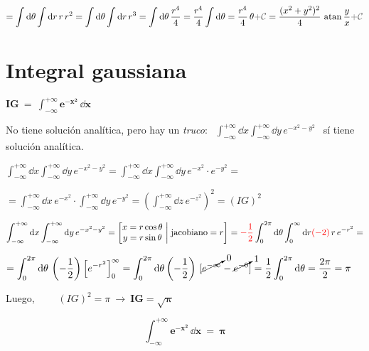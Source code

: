 $\displaystyle = \int \dd \theta \int \dd r \, r\, r^2 =\int \dd \theta \int \dd r \, r^3 = \int \dd \theta \, \dfrac {r^4} 4 = \dfrac {r^4} 4  \int \dd \theta = \dfrac {r^4} 4  \, \theta \textcolor{gris}{+ \mathcal C}=\dfrac{(x^2+y^2)^2}4 \, \atan \dfrac y x  \textcolor{gris}{+ \mathcal C}$

\section{Integral gaussiana}

$\boldsymbol{IG\ = \ \displaystyle \int_{-\infty}^{+\infty} e^{-x^2}\, \dd x } \qquad $ 

No tiene solución analítica, pero hay un \emph{truco}: $\ \ \displaystyle \int_{-\infty}^{+\infty} \dd x \int_{-\infty}^{+\infty} \dd y \, e^{-x^2-y^2}\ \ $ sí  tiene solución analítica.


$\displaystyle \int_{-\infty}^{+\infty} \dd x \int_{-\infty}^{+\infty} \dd y \, e^{-x^2-y^2}=\int_{-\infty}^{+\infty} \dd x \int_{-\infty}^{+\infty} \dd y \, e^{-x^2} \cdot e^{-y^2} = $

$\displaystyle = \int_{-\infty}^{+\infty} \dd x \, e^{-x^2} \cdot \int_{-\infty}^{+\infty} \dd y \, e^{-y^2} = \left( \int_{-\infty}^{+\infty} \dd z \, e^{-z^2}  \right)^2 = (IG)^2$

\vspace{5mm}
$\displaystyle \int_{-\infty}^{+\infty} \dd x \int_{-\infty}^{+\infty} \dd y \, e^{-x^2-y^2}=\left[ \mqty{ x=r\cos \theta \ \\ y=r\sin \theta \ }\right| \left. \text{jacobiano}=r  \mqty{ \\ \\ }   \right]= \textcolor{red}{-\dfrac 1 2 } \int_0^{2\pi} \dd \theta \int_0^\infty \dd r \textcolor{red}{(-2)}\, r \, e^{-r^2} = $

$\displaystyle = \int_0^{2\pi} \dd \theta \, \left( -\dfrac 1 2  \right)  \left[e^{-r^2} \right]_0^\infty =\int_0^{2\pi} \dd \theta \left(-\dfrac 1 2\right)\, [\cancelto{0}{e^{-\infty}} -\cancelto{1}{e^{-0}}] = \dfrac 1 2 \int_0^{2\pi} \dd \theta = \dfrac{2\pi}2=\pi$

\vspace{5mm} Luego, $\qquad  (IG)^2=\pi \ \to \ \boldsymbol{ IG=\sqrt{\pi} }$

\begin{equation}
\label{ApendicesIntegralGaussiana}
\boldsymbol{
	\boxed{ \ \int_{-\infty}^{+\infty} e^{-x^2}\, \dd x   \ = \ \pi \ }
}
\end{equation}


